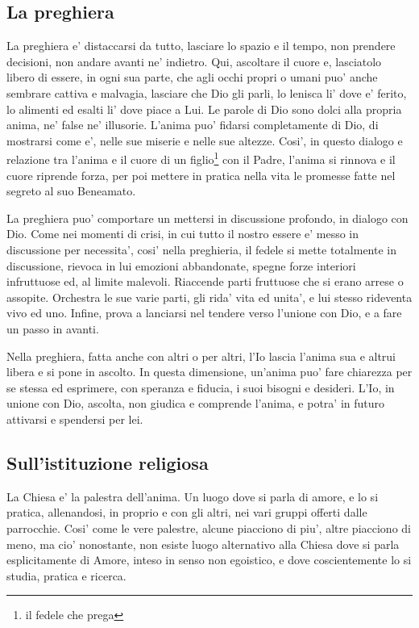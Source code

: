 \subsection{La preghiera}
La preghiera e' distaccarsi da tutto, lasciare lo spazio e il tempo, non prendere decisioni, non andare avanti ne' indietro. Qui, ascoltare il cuore e, lasciatolo libero di essere, in ogni sua parte, che agli occhi propri o umani puo' anche sembrare cattiva e malvagia, lasciare che Dio gli parli, lo lenisca li' dove e' ferito, lo alimenti ed esalti li' dove piace a Lui. Le parole di Dio sono dolci alla propria anima, ne' false ne' illusorie. L'anima puo' fidarsi completamente di Dio, di mostrarsi come e', nelle sue miserie e nelle sue altezze. Cosi', in questo dialogo e relazione tra l'anima e il cuore di un figlio\footnote{il fedele che prega} con il Padre, l'anima si rinnova e il cuore riprende forza, per poi mettere in pratica nella vita le promesse fatte nel segreto al suo Beneamato.

La preghiera puo' comportare un mettersi in discussione profondo, in dialogo con Dio. Come nei momenti di crisi, in cui tutto il nostro essere e' messo in discussione per necessita', cosi' nella preghieria, il fedele si mette totalmente in discussione, rievoca in lui emozioni abbandonate, spegne forze interiori infruttuose ed, al limite malevoli. Riaccende parti fruttuose che si erano arrese o assopite. Orchestra le sue varie parti, gli rida' vita ed unita', e lui stesso rideventa vivo ed uno. Infine, prova a lanciarsi nel tendere verso l'unione con Dio, e a fare un passo in avanti.

Nella preghiera, fatta anche con altri o per altri, l'Io lascia l'anima sua e altrui libera e si pone in ascolto. In questa dimensione, un'anima puo' fare chiarezza per se stessa ed esprimere, con speranza e fiducia, i suoi bisogni e desideri. 
L'Io, in unione con Dio, ascolta, non giudica e comprende l'anima, e potra' in futuro attivarsi e spendersi per lei.


\subsection{Sull'istituzione religiosa}
La Chiesa e' la palestra dell'anima. Un luogo dove si parla di amore, e lo si pratica, allenandosi, in proprio e con gli altri, nei vari gruppi offerti dalle parrocchie. Cosi' come le vere palestre, alcune piacciono di piu', altre piacciono di meno, ma cio' nonostante, non esiste luogo alternativo alla Chiesa dove si parla esplicitamente di Amore, inteso in senso non egoistico, e dove coscientemente lo si studia, pratica e ricerca. 

